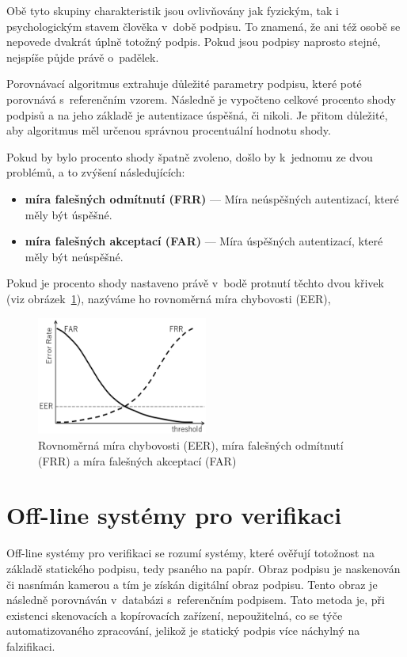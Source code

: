 Obě tyto skupiny charakteristik jsou ovlivňovány jak fyzickým, tak i psychologickým stavem člověka v~době podpisu.
To znamená, že ani též osobě se nepovede dvakrát úplně totožný podpis.
Pokud jsou podpisy naprosto stejné, nejspíše půjde právě o~padělek.

Porovnávací algoritmus extrahuje důležité parametry podpisu, které poté porovnává s~referenčním vzorem. 
Následně je vypočteno celkové procento shody podpisů a na jeho základě je autentizace úspěšná, či nikoli.
Je přitom důležité, aby algoritmus měl určenou správnou procentuální hodnotu shody. 

Pokud by bylo procento shody špatně zvoleno, došlo by k~jednomu ze dvou problémů, a to zvýšení následujících:
\begin{itemize}
  \item \textbf{míra falešných odmítnutí (FRR)} --- Míra neúspěšných autentizací, které měly být úspěšné.
  \item \textbf{míra falešných akceptací (FAR)} --- Míra úspěšných autentizací, které měly být neúspěšné.
\end{itemize}

Pokud je procento shody nastaveno právě v~bodě protnutí těchto dvou křivek (viz obrázek~\ref{fig:FAR_FRR}), nazýváme ho rovnoměrná míra chybovosti (EER), 

\begin{figure}[h]
  \centering
  \includegraphics[width=0.5\textwidth]{obrazky-figures/FAR_FRR.png}
  \caption{Rovnoměrná míra chybovosti (EER), míra falešných odmítnutí (FRR) a míra falešných akceptací (FAR)~\cite{cursorinsight_frr_fa}} %
  \label{fig:FAR_FRR}
\end{figure}

\newpage

\section{Off-line systémy pro verifikaci}
Off-line systémy pro verifikaci se rozumí systémy, které ověřují totožnost na základě statického podpisu, tedy psaného na papír.  %
Obraz podpisu je naskenován či nasnímán kamerou a tím je získán digitální obraz podpisu.                                          %
Tento obraz je následně porovnáván v~databázi s~referenčním podpisem.                                                             %
Tato metoda je, při existenci skenovacích a kopírovacích zařízení, nepoužitelná, co se týče automatizovaného zpracování, jelikož je statický podpis více náchylný na falzifikaci.~\cite{RakRoman2008}%

